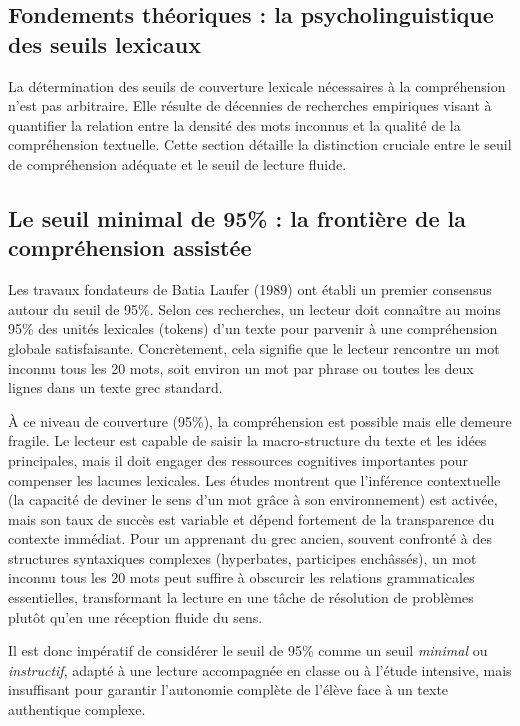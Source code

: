 {\subsection{Fondements théoriques : la psycholinguistique des seuils lexicaux}

La détermination des seuils de couverture lexicale nécessaires à la compréhension n'est pas
arbitraire. Elle résulte de décennies de recherches empiriques visant à quantifier la relation entre
la densité des mots inconnus et la qualité de la compréhension textuelle. Cette section détaille la
distinction cruciale entre le seuil de \og compréhension adéquate\fg{} et le seuil de \og lecture
fluide\fg{}.



\subsection{Le seuil minimal de 95\% : la frontière de la compréhension assistée}

Les travaux fondateurs de Batia Laufer (1989) ont établi un premier consensus autour du seuil de
95\%. Selon ces recherches, un lecteur doit connaître au moins 95\% des unités lexicales (tokens)
d'un texte pour parvenir à une compréhension globale satisfaisante.\cite{III-1-2-ref6} Concrètement,
cela signifie que le lecteur rencontre un mot inconnu tous les 20 mots, soit environ un mot par
phrase ou toutes les deux lignes dans un texte grec standard.

À ce niveau de couverture (95\%), la compréhension est possible mais elle demeure fragile. Le
lecteur est capable de saisir la macro-structure du texte et les idées principales, mais il doit
engager des ressources cognitives importantes pour compenser les lacunes lexicales. Les études
montrent que l'inférence contextuelle (la capacité de deviner le sens d'un mot grâce à son
environnement) est activée, mais son taux de succès est variable et dépend fortement de la
transparence du contexte immédiat.\cite{III-1-2-ref8} Pour un apprenant du grec ancien, souvent
confronté à des structures syntaxiques complexes (hyperbates, participes enchâssés), un mot inconnu
tous les 20 mots peut suffire à obscurcir les relations grammaticales essentielles, transformant la
lecture en une tâche de résolution de problèmes plutôt qu'en une réception fluide du
sens.\cite{III-1-2-ref9}

Il est donc impératif de considérer le seuil de 95\% comme un seuil \textit{minimal} ou
\textit{instructif}, adapté à une lecture accompagnée en classe ou à l'étude intensive, mais
insuffisant pour garantir l'autonomie complète de l'élève face à un texte authentique
complexe.\cite{III-1-2-ref2}



}
